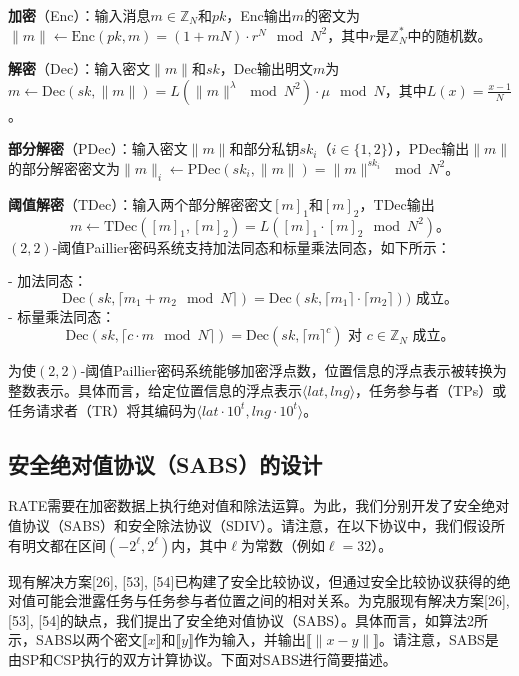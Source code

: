 \textbf{加密}（Enc）：输入消息\(m \in \mathbb{Z}_N\)和\(pk\)，Enc输出\(m\)的密文为\(\|m\| \leftarrow \text{Enc}(pk, m) = (1 + mN) \cdot r^N \mod N^2\)，其中\(r\)是\(\mathbb{Z}_N^{*}\)中的随机数。

\textbf{解密}（Dec）：输入密文\(\|m\|\)和\(sk\)，Dec输出明文\(m\)为\(m \leftarrow \text{Dec}(sk, \|m\|) = L(\|m\|^\lambda \mod N^2) \cdot \mu \mod N\)，其中\(L(x) = \frac{x-1}{N}\)。

\textbf{部分解密}（PDec）：输入密文\(\|m\|\)和部分私钥\(sk_i\)（\(i \in \{1, 2\}\)），PDec输出\(\|m\|\)的部分解密密文为\(\|m\|_i \leftarrow \text{PDec}(sk_i, \|m\|) = \|m\|^{sk_i} \mod N^2\)。


\textbf{阈值解密}（TDec）：输入两个部分解密密文\([m]_1\)和\([m]_2\)，TDec输出  
\[m \leftarrow \text{TDec}([m]_1, [m]_2) = L([m]_1 \cdot [m]_2 \mod N^2)。\]  
\((2,2)\)-阈值Paillier密码系统支持加法同态和标量乘法同态，如下所示：  

- 加法同态：  
  \[  \text{Dec}(sk, \lceil m_1 + m_2 \mod N \rceil) = \text{Dec}(sk, \lceil m_1 \rceil \cdot \lceil m_2 \rceil)) \text{ 成立。}\]  
- 标量乘法同态：  
  \[  \text{Dec}(sk, \lceil c \cdot m \mod N \rceil) = \text{Dec}(sk, \lceil m \rceil^c) \text{ 对 } c \in \mathbb{Z}_N \text{ 成立。}\]  

为使\((2,2)\)-阈值Paillier密码系统能够加密浮点数，位置信息的浮点表示被转换为整数表示。具体而言，给定位置信息的浮点表示\(\langle lat, lng\rangle\)，任务参与者（TPs）或任务请求者（TR）将其编码为\(\langle lat \cdot 10^t, lng \cdot 10^t \rangle\)。

\subsection{安全绝对值协议（SABS）的设计}

RATE需要在加密数据上执行绝对值和除法运算。为此，我们分别开发了安全绝对值协议（SABS）和安全除法协议（SDIV）。请注意，在以下协议中，我们假设所有明文都在区间\((-2^{\ell},2^{\ell})\)内，其中\(\ell\)为常数（例如\(\ell=32\)）。

现有解决方案[26], [53], [54]已构建了安全比较协议，但通过安全比较协议获得的绝对值可能会泄露任务与任务参与者位置之间的相对关系。为克服现有解决方案[26], [53], [54]的缺点，我们提出了安全绝对值协议（SABS）。具体而言，如算法2所示，SABS以两个密文\(\llbracket x\rrbracket\)和\(\llbracket y\rrbracket\)作为输入，并输出\(\llbracket\|x-y\|\rrbracket\)。请注意，SABS是由SP和CSP执行的双方计算协议。下面对SABS进行简要描述。

